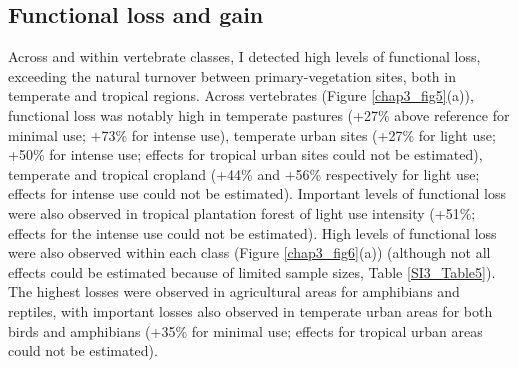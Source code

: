 \subsection{Functional loss and gain}

Across and within vertebrate classes, I detected high levels of functional loss, exceeding the natural turnover between primary-vegetation sites, both in temperate and tropical regions. Across vertebrates (Figure \ref{chap3_fig5}(a)), functional loss was notably high in temperate pastures (+27\% above reference for minimal use; +73\% for intense use), temperate urban sites (+27\% for light use; +50\% for intense use; effects for tropical urban sites could not be estimated), temperate and tropical cropland (+44\% and +56\% respectively for light use; effects for intense use could not be estimated). Important levels of functional loss were also observed in tropical plantation forest of light use intensity (+51\%; effects for the intense use could not be estimated). High levels of functional loss were also observed within each class (Figure \ref{chap3_fig6}(a)) (although not all effects could be estimated because of limited sample sizes, Table \ref{SI3_Table5}). The highest losses were observed in agricultural areas for amphibians and reptiles, with important losses also observed in temperate urban areas for both birds and amphibians (+35\% for minimal use; effects for tropical urban areas could not be estimated).

